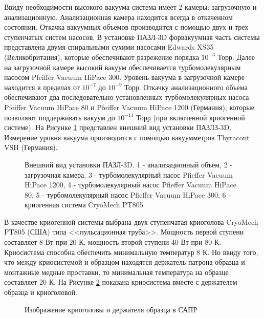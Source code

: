 Ввиду необходимости высокого вакуума система имеет 2 камеры: загрузочную и анализационную. Анализационная камера находится всегда в откаченном состоянии. Откачка вакуумных объемов производится с помощью двух и трех ступенчатых систем насосов. В установке ПАЗЛ-3D форвакуумная часть системы представлена двумя спиральными сухими насосами Edwards XS35 (Великобритания), которые обеспечивают разрежение порядка $10^{-3}$ Торр. Далее на загрузочной камере высокий вакуум обеспечивается турбомолекулярным насосом Pfeiffer Vacuum HiPace 300. Уровень вакуума в загрузочной камере находится в пределах от $10^{-7}$ до $10^{-9}$ Торр. Откачку анализационного объема обеспечивают два последовательно установленных турбомолекулярных насоса Pfeiffer Vacuum HiPace 80 и Pfeiffer Vacuum HiPace 1200 (Германия), которые позволяют поддерживать вакуум до $10^{-11}$ Торр (при включенной криогенной системе). На Рисунке \cref{fig:APPLE_foto_main} представлен внешний вид установки ПАЗЛЗ-3D. Измерение уровня вакуума производится с помощью вакуумметров Thyracont VSH (Германия).

\begin{figure}[htb]
	\caption{Внешний вид установки ПАЗЛ-3D. 1 - анализационный объем, 2 - загрузочная камера, 3 - турбомолекулярный насос Pfieffer Vacuum HiPace 1200, 4 - турбомолекулярный насос Pfieffer Vacuum HiPace 80, 5 - турбомолекулярный насос Pfieffer Vacuum HiPace 300, 6 - криогенная система CryoMech PT805}
	\label{fig:APPLE_foto_main}
\end{figure}

\FloatBarrier
В качестве криогенной системы выбрана двух-ступенчатая криоголова CryoMech PT805 (США) типа <<пульсационная труба>>. Мощность первой ступени составляет 8 Вт при 20 К, мощность второй ступени 40 Вт при 80 К. Криосистема способна обеспечить минимальную температур 8 К. Но ввиду того, что между криосистемой и образцом находятся держатель патрона образца и монтажные медные проставки, то минимальная температура на образце составляет 20 К. На Рисунке \cref{fig:APPLE_cryosystem} показана криосистема вместе с держателем образца и криоголовой.

\begin{figure}[htb]
	\caption{Изображение криоголовы и держателя образца в САПР}
	\label{fig:APPLE_cryosystem}
\end{figure}

\FloatBarrier

